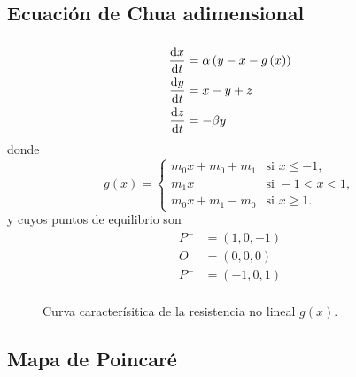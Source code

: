 \subsection{Ecuación de Chua adimensional}

\begin{frame}
	\frametitle{\subsecname}

	\begin{minipage}{0.45\textwidth}
		\begin{align*}
			\diff{x}{t} & = \alpha\left(y - x - g\left(x\right)\right) \\
			\diff{y}{t} & = x - y + z                                  \\
			\diff{z}{t} & = -\beta y
		\end{align*}
		donde
		\begin{equation*}
			g\left(x\right)=
			\begin{cases}
				m_{0}x + m_{0} + m_{1} & \text{si } x\leq -1,   \\
				m_{1}x                 & \text{si } -1 < x < 1, \\
				m_{0}x + m_{1} - m_{0} & \text{si } x \geq 1.
			\end{cases}
		\end{equation*}
		y cuyos puntos de equilibrio son
		\begin{align*}
			P^{+} & =\left(1,0,-1\right) \\
			O     & =\left(0,0,0\right)  \\
			P^{-} & =\left(-1,0,1\right) \\
		\end{align*}
	\end{minipage}
	\begin{minipage}{0.45\textwidth}
		\begin{figure}[ht!]
			\centering
			
			\caption{Curva caracterísitica de la resistencia no lineal $g\left(x\right)$.}\label{fig:piecewise}%
		\end{figure}
	\end{minipage}
\end{frame}

\subsection{Mapa de Poincaré}

